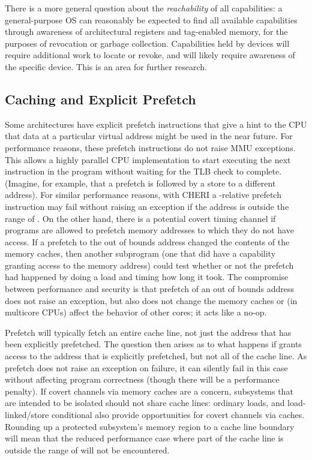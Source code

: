 There is a more general question about the \textit{reachability} of all
capabilities: a general-purpose OS can reasonably be expected to find all
available capabilities through awareness of architectural registers and
tag-enabled memory, for the purposes of revocation or garbage collection.
Capabilities held by devices will require additional work to locate or
revoke, and will likely require awareness of the specific device.
This is an area for further research.

\subsection{Caching and Explicit Prefetch}
\label{sec:caching-and-explicit-prefetch}

Some architectures have explicit
prefetch instructions that give a hint to the CPU that data at a particular
virtual address might be used in the near future. For performance reasons,
these prefetch instructions do not raise MMU exceptions. This allows a highly
parallel CPU implementation to start executing the next instruction in the program
without waiting for the TLB check to complete. (Imagine, for example, that
a prefetch is followed by a store to a different address). For similar performance
reasons, with CHERI a \DDC{}-relative prefetch instruction may fail without raising
an exception if the address is outside the range of \DDC{}. On the other hand,
there is a potential covert timing channel if programs are allowed to prefetch
memory addresses to which they do not have access. If a prefetch to the out of
bounds address changed the contents of the memory caches, then another subprogram
(one that did have a capability granting access to the memory address) could
test whether or not the prefetch had happened by doing a load and timing how
long it took. The compromise between performance and security is that prefetch
of an out of bounds address does not raise an exception, but also does not
change the memory caches or (in multicore CPUs) affect the behavior of other cores;
it acts like a no-op.

Prefetch will typically fetch an entire cache line, not just the address that
has been explicitly prefetched. The question then arises as to what happens
if \DDC{} grants access to the address that is explicitly prefetched, but not
all of the cache line. As prefetch does not raise an exception on failure, it
can silently fail in this case without affecting program correctness (though
there will be a performance penalty). If covert
channels via memory caches are a concern, subsystems that are intended to be
isolated should not share cache lines: ordinary loads, and load-linked/store conditional
also provide opportunities for covert channels via caches. Rounding up a protected subsystem's
memory region to a cache line boundary will mean that the reduced performance case
where part of the cache line is outside the range of \DDC{} will not be encountered.

